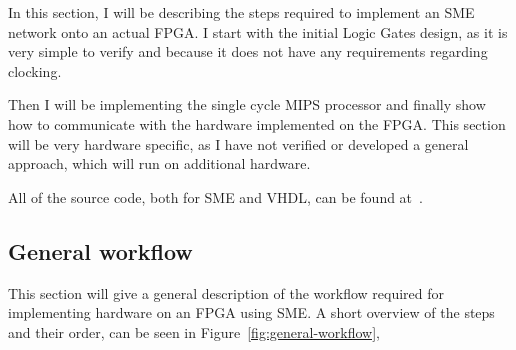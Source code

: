 In this section, I will be describing the steps required to implement an SME
network onto an actual FPGA. I start with the initial Logic Gates design, as it
is very simple to verify and because it does not have any requirements
regarding clocking.

Then I will be implementing the single cycle MIPS processor and finally show
how to communicate with the hardware implemented on the FPGA. This section will
be very hardware specific, as I have not verified or developed a
general approach, which will run on additional hardware.

All of the source code, both for SME and VHDL, can be found
at~\cite{ref:github}.

\subsection{General workflow}
This section will give a general description of the workflow required for
implementing hardware on an FPGA using SME. A short overview of the steps and
their order, can be seen in Figure~\ref{fig:general-workflow},

